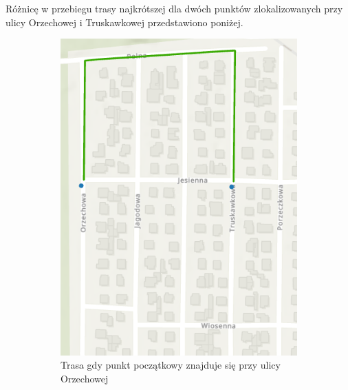\documentclass{article}
\begin{document}
Różnicę w przebiegu trasy najkrótszej dla dwóch punktów zlokalizowanych przy ulicy Orzechowej i Truskawkowej przedstawiono poniżej.
\begin{figure}[H]
    \centering
    \begin{subfigure}[b]{0.45\textwidth}
        \centering
        \includegraphics[width=\textwidth]{img/kierunek-orzechowa-truskawkowa.png}
        \caption{Trasa gdy punkt początkowy znajduje się przy ulicy Orzechowej}
    \end{subfigure}
    \hfill
    \begin{subfigure}[b]{0.45\textwidth}
        \centering

\end{subfigure}
\end{figure}
\end{document}
